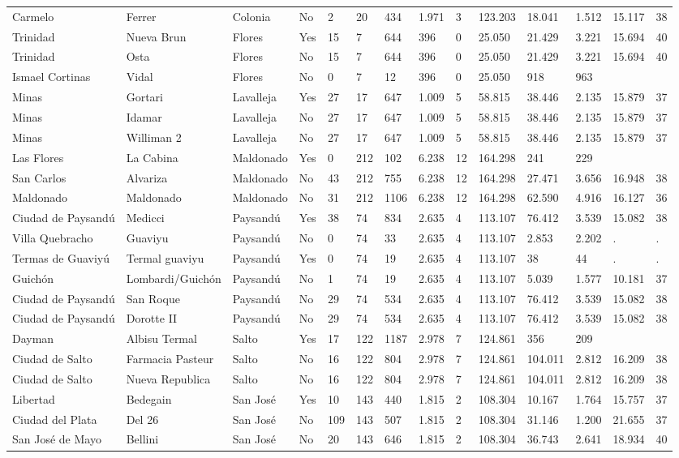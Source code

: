 \documentclass[11pt]{article}
\begin{document}
\begin{landscape}
\begin{longtable}[htbp]{@{}p{1.2cm}p{1cm}p{1.5cm}p{1cm}p{1cm}p{1cm}p{1cm}p{1cm}p{1cm}p{1cm}p{1cm}p{1.2cm}p{1cm}p{1cm}@{}}
Carmelo	&	Ferrer	&	Colonia	&	No	&	2	&	20	&	434	&	1.971	&	3	&	123.203	&	18.041	&	1.512	&	15.117	&	38	\tabularnewline
Trinidad	&	Nueva Brun	&	Flores	&	Yes	&	15	&	7	&	644	&	396	&	0	&	25.050	&	21.429	&	3.221	&	15.694	&	40	\tabularnewline
Trinidad	&	Osta	&	Flores	&	No	&	15	&	7	&	644	&	396	&	0	&	25.050	&	21.429	&	3.221	&	15.694	&	40	\tabularnewline
Ismael Cortinas	&	Vidal	&	Flores	&	No	&	0	&	7	&	12	&	396	&	0	&	25.050	&	918	&	963	&		&		\tabularnewline
Minas	&	Gortari	&	Lavalleja	&	Yes	&	27	&	17	&	647	&	1.009	&	5	&	58.815	&	38.446	&	2.135	&	15.879	&	37	\tabularnewline
Minas	&	Idamar	&	Lavalleja	&	No	&	27	&	17	&	647	&	1.009	&	5	&	58.815	&	38.446	&	2.135	&	15.879	&	37	\tabularnewline
Minas	&	Williman 2	&	Lavalleja	&	No	&	27	&	17	&	647	&	1.009	&	5	&	58.815	&	38.446	&	2.135	&	15.879	&	37	\tabularnewline
Las Flores	&	La Cabina	&	Maldonado	&	Yes	&	0	&	212	&	102	&	6.238	&	12	&	164.298	&	241	&	229	&		&		\tabularnewline
San Carlos	&	Alvariza	&	Maldonado	&	No	&	43	&	212	&	755	&	6.238	&	12	&	164.298	&	27.471	&	3.656	&	16.948	&	38	\tabularnewline
Maldonado	&	Maldonado	&	Maldonado	&	No	&	31	&	212	&	1106	&	6.238	&	12	&	164.298	&	62.590	&	4.916	&	16.127	&	36	\tabularnewline
Ciudad de Paysandú	&	Medicci	&	Paysandú	&	Yes	&	38	&	74	&	834	&	2.635	&	4	&	113.107	&	76.412	&	3.539	&	15.082	&	38	\tabularnewline
Villa Quebracho	&	Guaviyu	&	Paysandú	&	No	&	0	&	74	&	33	&	2.635	&	4	&	113.107	&	2.853	&	2.202	&	.	&	.	\tabularnewline
Termas de Guaviyú	&	Termal guaviyu	&	Paysandú	&	Yes	&	0	&	74	&	19	&	2.635	&	4	&	113.107	&	38	&	44	&	.	&	.	\tabularnewline
Guichón	&	Lombardi/Guichón	&	Paysandú	&	No	&	1	&	74	&	19	&	2.635	&	4	&	113.107	&	5.039	&	1.577	&	10.181	&	37	\tabularnewline
Ciudad de Paysandú	&	San Roque	&	Paysandú	&	No	&	29	&	74	&	534	&	2.635	&	4	&	113.107	&	76.412	&	3.539	&	15.082	&	38	\tabularnewline
Ciudad de Paysandú	&	Dorotte II	&	Paysandú	&	No	&	29	&	74	&	534	&	2.635	&	4	&	113.107	&	76.412	&	3.539	&	15.082	&	38	\tabularnewline
Dayman	&	Albisu Termal	&	Salto	&	Yes	&	17	&	122	&	1187	&	2.978	&	7	&	124.861	&	356	&	209	&		&		\tabularnewline
Ciudad de Salto	&	Farmacia Pasteur	&	Salto	&	No	&	16	&	122	&	804	&	2.978	&	7	&	124.861	&	104.011	&	2.812	&	16.209	&	38	\tabularnewline
Ciudad de Salto	&	Nueva Republica	&	Salto	&	No	&	16	&	122	&	804	&	2.978	&	7	&	124.861	&	104.011	&	2.812	&	16.209	&	38	\tabularnewline
Libertad	&	Bedegain	&	San José	&	Yes	&	10	&	143	&	440	&	1.815	&	2	&	108.304	&	10.167	&	1.764	&	15.757	&	37	\tabularnewline
Ciudad del Plata	&	Del 26	&	San José	&	No	&	109	&	143	&	507	&	1.815	&	2	&	108.304	&	31.146	&	1.200	&	21.655	&	37	\tabularnewline
San José de Mayo	&	Bellini	&	San José	&	No	&	20	&	143	&	646	&	1.815	&	2	&	108.304	&	36.743	&	2.641	&	18.934	&	40	\tabularnewline

\end{longtable}
\end{landscape}
\end{document}
